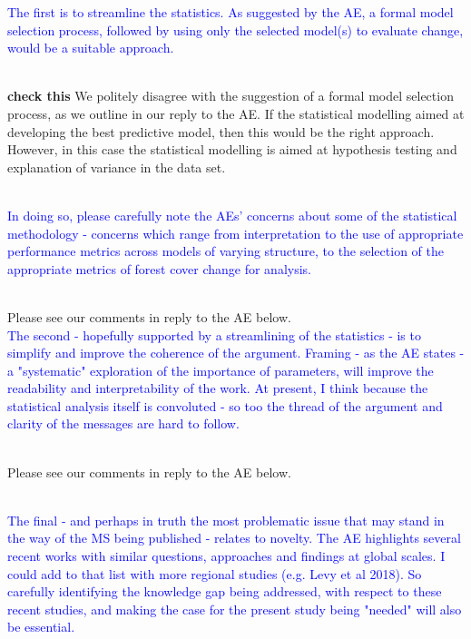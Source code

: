 \documentclass[]{elsarticle} %
\begin{document}
\textcolor{blue}{The first is to streamline the statistics.  As suggested by the AE, a formal model selection process, followed by using only the selected model(s) to evaluate change, would be a suitable approach.}\\
\strut \\
\textbf{check this}
We politely disagree with the suggestion of a formal model selection process, as we outline in our reply to the AE. If the statistical modelling aimed at developing the best predictive model, then this would be the right approach. However, in this case the statistical modelling is aimed at hypothesis testing and explanation of variance in the data set.\\
\strut \\
\textcolor{blue}{In doing so, please carefully note the AEs' concerns about some of the statistical methodology - concerns which range from interpretation to the use of appropriate performance metrics across models of varying structure, to the selection of the appropriate metrics of forest cover change for analysis.}\\
\strut \\
Please see our comments in reply to the AE below.\\
\hspace*{0.333em}
\textcolor{blue}{The second - hopefully supported by a streamlining of the statistics - is to simplify and improve the coherence of the argument.  Framing - as the AE states - a "systematic" exploration of the importance of parameters, will improve the readability and interpretability of the work.  At present, I think because the statistical analysis itself is convoluted - so too the thread of the argument and clarity of the messages are hard to follow.}\\
\strut \\
Please see our comments in reply to the AE below.\\
\strut \\

\textcolor{blue}{The final - and perhaps in truth the most problematic issue that may stand in the way of the MS being published - relates to novelty.  The AE highlights several recent works with similar questions, approaches and findings at global scales.  I could add to that list with more regional studies (e.g. Levy et al 2018).  So carefully identifying the knowledge gap being addressed, with respect to these recent studies, and making the case for the present study being "needed" will also be essential.}\\
\strut \\
\end{document}
